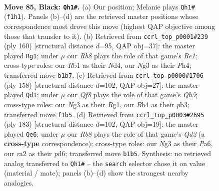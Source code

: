 \documentclass[11pt]{article}
\begin{document}
\clearpage

\begin{figure}[p]\centering
\begin{subfigure}{0.46\textwidth}\centering
\resizebox{\linewidth}{!}{%
\newchessgame
\chessboard[
  setfen={8/6k1/8/P1p2p2/3p1Ppb/4P1n1/R1QB3K/1r1N1q2 b - - 14 85},
  showmover=false,
  pgfstyle=straightmove, color=movearrow, markmove={f1-h1}
]}
\caption{}
\end{subfigure}\hfill
\begin{subfigure}{0.46\textwidth}\centering
\resizebox{\linewidth}{!}{%
\newchessgame
\chessboard[
  setfen={1bb1Q3/6k1/5p2/3pp2p/3N3P/P1P3P1/5q2/4R2K w - - 2 81},
  showmover=false,
  pgfstyle=straightmove, color=movearrow, markmove={e1-g1}
]}
\caption{}
\end{subfigure}
\\[4pt]
\begin{subfigure}{0.46\textwidth}\centering
\resizebox{\linewidth}{!}{%
\newchessgame
\chessboard[
  setfen={8/8/1p1N1r1p/3P3Q/2Pnpq2/Pp6/1P3k2/K5R1 w - - 17 80},
  showmover=false,
  pgfstyle=straightmove, color=movearrow, markmove={h5-d1}
]}
\caption{}
\end{subfigure}\hfill
\begin{subfigure}{0.46\textwidth}\centering
\resizebox{\linewidth}{!}{%
\newchessgame
\chessboard[
  setfen={6k1/3q1pp1/p1QP1n1p/1p2N3/1P5P/P5P1/6K1/8 b - - 0 92},
  showmover=false,
  pgfstyle=straightmove, color=movearrow, markmove={d7-e6}
]}
\caption{}
\end{subfigure}
\caption{\textbf{Move 85, Black: \texttt{Qh1\#}.} (a) Our position; Melanie plays \texttt{Qh1\#} (\texttt{f1h1}). Panels (b)--(d) are the retrieved master positions whose correspondence most drove this move (highest QAP objective among those that transfer to it). (b) Retrieved from \texttt{ccrl\_top\_p0001\#239} (ply 160) [structural distance $d$=95, QAP obj=37]: the master played \texttt{Rg1}; under $\mu$ our \emph{Rb8} plays the role of that game's \emph{Re1}; cross-type roles: our \emph{R}b1 as their \emph{N}d4, our \emph{N}g3 as their \emph{P}h4; transferred move \texttt{b1b7}. (c) Retrieved from \texttt{ccrl\_top\_p0000\#1706} (ply 158) [structural distance $d$=102, QAP obj=27]: the master played \texttt{Qd1}; under $\mu$ our \emph{Qf8} plays the role of that game's \emph{Qh5}; cross-type roles: our \emph{N}g3 as their \emph{R}g1, our \emph{B}h4 as their \emph{p}b3; transferred move \texttt{f1b5}. (d) Retrieved from \texttt{ccrl\_top\_p0003\#2695} (ply 183) [structural distance $d$=102, QAP obj=19]: the master played \texttt{Qe6}; under $\mu$ our \emph{Rb8} plays the role of that game's \emph{Qd2} (a \textbf{cross-type} correspondence); cross-type roles: our \emph{N}g3 as their \emph{P}a6, our \emph{r}a2 as their \emph{p}d6; transferred move \texttt{b1b5}. Synthesis: no retrieved analog transferred to \texttt{Qh1\#} -- the \texttt{search} selector chose it on value (material / mate); panels (b)--(d) show the strongest nearby analogies.}
\label{fig:thought-m169}
\end{figure}
\end{document}
